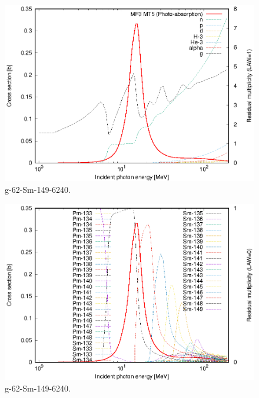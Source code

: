 \begin{figure}
 \includegraphics[width=\linewidth]{eps/g_62-Sm-149_6240.eps}
  \caption{g-62-Sm-149-6240.}
\end{figure}
\begin{figure}
 \includegraphics[width=\linewidth]{eps-law0/g_62-Sm-149_6240.eps}
 \caption{g-62-Sm-149-6240.}
\end{figure}
\newpage \clearpage


